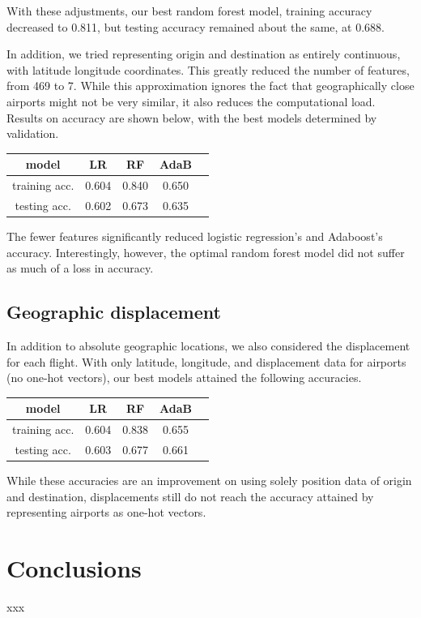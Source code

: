 \documentclass{article}
\begin{document}
\begin{multicols}{2}
With these adjustments,
our best random forest model,
training accuracy decreased to 0.811,
but testing accuracy remained about the same,
at 0.688.

In addition, we tried representing origin and destination
as entirely continuous,
with latitude longitude coordinates.
This greatly reduced the number of features, from 469 to 7.
While this approximation ignores the fact that
geographically close airports might not be very similar,
it also reduces the computational load.
Results on accuracy are shown below,
with the best models determined by validation.

\begin{center}
    \begin{tabular}{c|cccc}
        model &
          LR & RF & AdaB \\\hline
        training acc. &
          0.604 & 0.840 & 0.650 \\
        testing acc. &
          0.602 & 0.673 & 0.635
    \end{tabular}
\end{center}

The fewer features significantly reduced
logistic regression's and Adaboost's accuracy.
Interestingly, however, the optimal random forest model
did not suffer as much of a loss in accuracy.

\subsection{Geographic displacement}

In addition to absolute geographic locations,
we also considered the displacement
for each flight.
With only latitude, longitude, and displacement data
for airports (no one-hot vectors),
our best models attained the following accuracies.

\begin{center}
    \begin{tabular}{c|cccc}
        model &
          LR & RF & AdaB \\\hline
        training acc. &
          0.604 & 0.838 & 0.655 \\
        testing acc. &
          0.603 & 0.677 & 0.661
    \end{tabular}
\end{center}

While these accuracies are an improvement
on using solely position data of origin and destination,
displacements still do not reach the accuracy attained
by representing airports as one-hot vectors.

\section{Conclusions}

xxx

\end{multicols}
\end{document}

